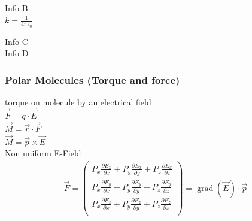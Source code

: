 Info B\\
$ k=\frac{1}{4\pi\epsilon_0} $

Info C\\


Info D\\

\subsubsection{Polar Molecules (Torque and force)}

torque on molecule by an electrical field\\

$ \vec{F}=q\cdot\vec{E}$\\

$ \vec{M}=\vec{r}\cdot\vec{F}$\\

$ \vec{M}=\vec{p}\times\vec{E}$\\

Non uniform E-Field\\

\begin{align}
\vec F = \begin{pmatrix}
P_x \frac{\partial E_x}{\partial x} + P_y \frac{\partial E_x}{\partial y} + P_z
\frac{\partial E_x}{\partial z}\\
P_x \frac{\partial E_y}{\partial x} + P_y \frac{\partial E_y}{\partial y} + P_z
\frac{\partial E_y}{\partial z}\\
P_x \frac{\partial E_z}{\partial x} + P_y \frac{\partial E_z}{\partial y} + P_z
\frac{\partial E_z}{\partial z}\\
\end{pmatrix}
= \operatorname{grad} (\vec E) \cdot \vec p
\end{align}


